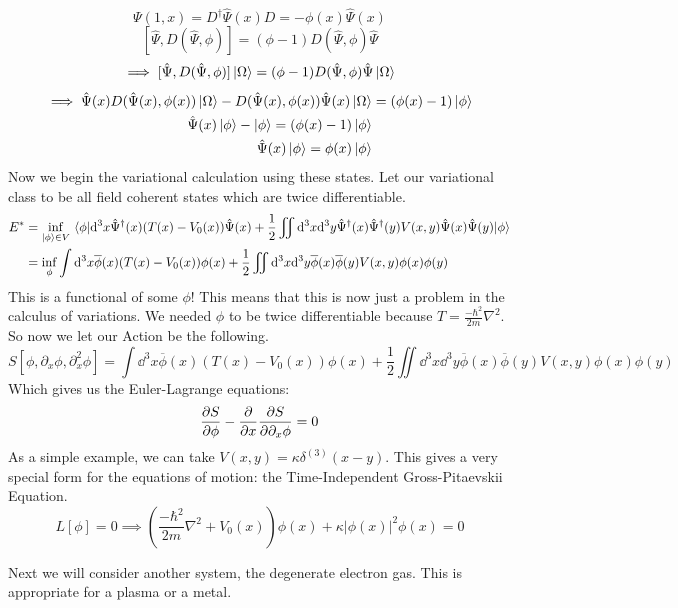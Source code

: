 \documentclass{article}
\begin{document}
\begin{equation}
\Psi(1,x)=D^\dagger \hat\Psi(x) D = -\phi(x)\hat\Psi(x)
\end{equation}
\[[\hat\Psi,D(\hat\Psi,\phi)] = (\phi-1)D(\hat\Psi,\phi)\hat\Psi\]
\[\implies [\hat\Psi,D(\hat\Psi,\phi)]\ket{\Omega} = (\phi-1)D(\hat\Psi,\phi)\hat\Psi\ket{\Omega}\]
\begin{align}
\implies \hat\Psi(x) D(\hat\Psi(x),\phi(x))\ket{\Omega} - D(\hat\Psi(x),\phi(x))\hat\Psi(x)\ket{\Omega} &= (\phi(x)-1)\ket{\phi}\\
\hat\Psi(x)\ket{\phi}-\ket{\phi}=(\phi(x)-1)\ket{\phi}\\
\hat\Psi(x)\ket{\phi}=\phi(x)\ket{\phi}
\end{align}
Now we begin the variational calculation using these states. Let our variational class to be all field coherent states which are twice differentiable.
\begin{align}
E^* &= \inf_{\ket{\phi}\in V} \expval{\dd^3 x \hat\Psi^\dagger(x)(T(x)-V_0(x))\hat\Psi(x) + \frac{1}{2}\iint\dd^3 x \dd^3 y \hat\Psi^\dagger(x)\hat\Psi^\dagger(y)V(x,y)\hat\Psi(x)\hat\Psi(y)}{\phi}\\
&= \inf_{\phi}\int \dd^3 x\overline\phi(x) (T(x)-V_0(x))\phi(x)+\frac{1}{2} \iint \dd^3 x \dd^3 y \overline\phi(x)\overline\phi(y)V(x,y)\phi(x)\phi(y)
\end{align}
This is a functional of some $\phi$! This means that this is now just a problem in the calculus of variations. We needed $\phi$ to be twice differentiable because $T = \frac{-\hbar^2}{2m}\nabla^2$. So now we let our Action be the following.
\[S[\phi,\partial_x \phi, \partial_x^2 \phi] =\int \dd^3 x\overline\phi(x) (T(x)-V_0(x))\phi(x)+\frac{1}{2} \iint \dd^3 x \dd^3 y \overline\phi(x)\overline\phi(y)V(x,y)\phi(x)\phi(y)\]
Which gives us the Euler-Lagrange equations:
\begin{equation}
\pdv{S}{\phi}-\pdv{x}\pdv{S}{\partial_x\phi} = 0
\end{equation}
As a simple example, we can take $V(x,y) = \kappa \delta^{(3)}(x-y)$. This gives a very special form for the equations of motion: the Time-Independent Gross-Pitaevskii Equation.
\begin{equation}
L[\phi]=0\implies \left(\frac{-\hbar^2}{2m}\nabla^2 + V_0(x)\right)\phi(x) + \kappa|\phi(x)|^2 \phi(x)=0
\end{equation}

Next we will consider another system, the degenerate electron gas. This is appropriate for a plasma or a metal.
\end{document}
